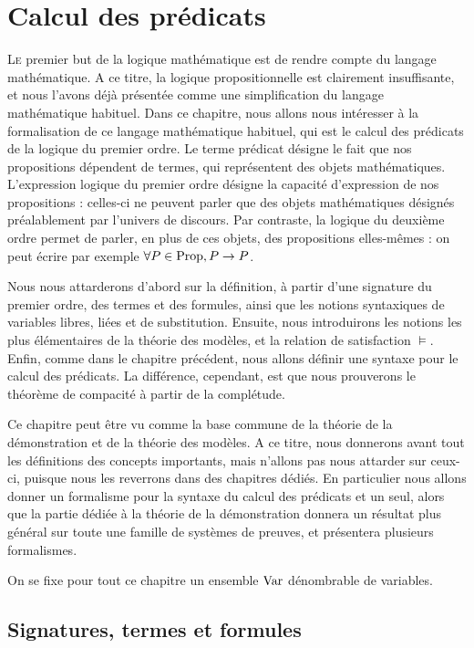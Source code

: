\chapter{Calcul des prédicats}
\label{chp.logpred}

\minitoc

\lettrine{L}{e} premier but de la logique mathématique est de rendre compte du
langage mathématique. A ce titre, la logique propositionnelle est clairement
insuffisante, et nous l'avons déjà présentée comme une simplification du langage
mathématique habituel. Dans ce chapitre, nous allons nous intéresser à la
formalisation de ce langage mathématique habituel, qui est le calcul des
prédicats de la logique du premier ordre. Le terme prédicat désigne le fait que
nos propositions dépendent de termes, qui représentent des objets mathématiques.
L'expression \og logique du premier ordre\fg{} désigne la capacité d'expression
de nos propositions : celles-ci ne peuvent parler que des objets mathématiques
désignés préalablement par l'univers de discours. Par contraste, la logique du
deuxième ordre permet de parler, en plus de ces objets, des propositions
elles-mêmes : on peut écrire par exemple $\forall P\in\operatorname{Prop}, P\to P$.

Nous nous attarderons d'abord sur la définition, à partir d'une signature du
premier ordre, des termes et des formules, ainsi que les notions syntaxiques de
variables libres, liées et de substitution. Ensuite, nous introduirons les
notions les plus élémentaires de la théorie des modèles, et la relation de
satisfaction $\models$. Enfin, comme dans le chapitre précédent, nous allons
définir une syntaxe pour le calcul des prédicats. La différence, cependant,
est que nous prouverons le théorème de compacité à partir de la complétude.

Ce chapitre peut être vu comme la base commune de la théorie de la démonstration
et de la théorie des modèles. A ce titre, nous donnerons avant tout les
définitions des concepts importants, mais n'allons pas nous attarder sur
ceux-ci, puisque nous les reverrons dans des chapitres dédiés. En particulier
nous allons donner un formalisme pour la syntaxe du calcul des prédicats et un
seul, alors que la partie dédiée à la théorie de la démonstration donnera un
résultat plus général sur toute une famille de systèmes de preuves, et
présentera plusieurs formalismes.

On se fixe pour tout ce chapitre un ensemble $\operatorname{Var}$ dénombrable de variables.

\section{Signatures, termes et formules}

